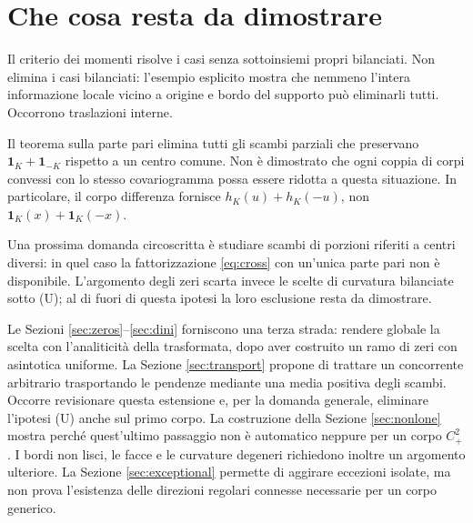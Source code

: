 \documentclass[11pt,a4paper]{article}
\theoremstyle{remark}
\newcommand{\ind}{\mathbf 1}
\begin{document}
\section{Che cosa resta da dimostrare}
Il criterio dei momenti risolve i casi senza sottoinsiemi propri bilanciati.
Non elimina i casi bilanciati: l'esempio esplicito mostra che nemmeno
l'intera informazione locale vicino a origine e bordo del supporto
può eliminarli tutti. Occorrono traslazioni interne.

Il teorema sulla parte pari elimina tutti gli scambi parziali che preservano
$\ind_K+\ind_{-K}$ rispetto a un centro comune. Non è dimostrato che
ogni coppia di corpi convessi con lo stesso covariogramma possa essere
ridotta a questa situazione. In particolare, il corpo differenza fornisce
$h_K(u)+h_K(-u)$, non $\ind_K(x)+\ind_K(-x)$.

Una prossima domanda circoscritta è studiare scambi di porzioni riferiti
a centri diversi: in quel caso la fattorizzazione \eqref{eq:cross} con
un'unica parte pari non è disponibile. L'argomento degli zeri scarta
invece le scelte di curvatura bilanciate sotto (U); al di fuori di
questa ipotesi la loro esclusione resta da dimostrare.

Le Sezioni \ref{sec:zeros}--\ref{sec:dini} forniscono una terza strada:
rendere globale la scelta con l'analiticità della trasformata, dopo aver
costruito un ramo di zeri con asintotica uniforme. La Sezione
\ref{sec:transport} propone di trattare un concorrente arbitrario
trasportando le pendenze mediante una media positiva degli scambi.
Occorre revisionare questa estensione e, per la domanda generale,
eliminare l'ipotesi (U) anche sul primo corpo. La costruzione della
Sezione \ref{sec:nonlone} mostra perché quest'ultimo passaggio non è
automatico neppure per un corpo $C^2_+$. I bordi non lisci, le facce
e le curvature degeneri richiedono inoltre un argomento ulteriore.
La Sezione \ref{sec:exceptional} permette di aggirare eccezioni isolate,
ma non prova l'esistenza delle direzioni regolari connesse necessarie
per un corpo generico.
\end{document}
